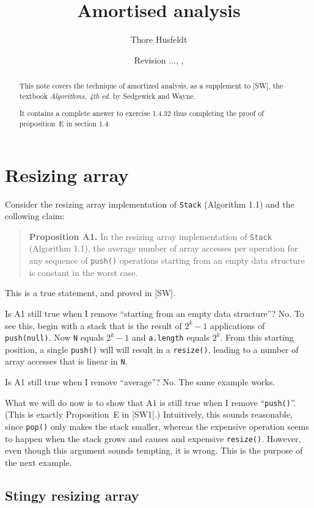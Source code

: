 \documentclass{tufte-handout}
\title{Amortised analysis}
\author{Thore Husfeldt}
\date{\small Revision {\tt \GITAbrHash}$\ldots$, \GITAuthorDate, \GITAuthorName}
\begin{document}
\maketitle
\begin{abstract}
  This note covers the technique of amortized analysis, as a
  supplement to [SW], the textbook \emph{Algorithms, 4th ed.} by
  Sedgewick and Wayne.

  It contains a complete answer to exercise 1.4.32 thus completing the
  proof of proposition~E in section 1.4.
\end{abstract}

\section{Resizing array}
\label{sec-1.1}

Consider the resizing array implementation of {\tt Stack} (Algorithm
1.1) and the collowing claim:

   
\begin{quote} {\bf Proposition A1.} In the resizing array
  implementation of {\tt Stack} (Algorithm 1.1), the average number of
  array accesses per operation for any sequence of {\tt push()} operations starting
  from an empty data structure is constant in the worst case.
\end{quote}

This is a true statement, and proved in [SW].

Is A1 still true when I remove ``starting from an empty data
structure''?
No.
To see this, begin with a stack that is the result of $2^k-1$
applications of {\tt push(null)}. 
Now {\tt N} equals $2^k-1$ and {\tt  a.length} equals $2^k$. 
From this starting position, a single {\tt push()} will will result in
a {\tt resize()}, leading to a  number of array accesses that is
linear in {\tt N}.
   
Is A1 still true when I remove ``average''?
No.
The same example works.
   
What we will do now is to show that A1 is still true when I remove
``{\tt push()}''. 
(This is exactly Proposition~E in [SW1].)
Intuitively, this sounds reasonable, since {\tt pop()} only makes the
stack smaller, whereas the expensive operation seems to happen when
the stack grows and causes and expensive {\tt resize()}.
However, even though this argument sounds tempting, it is wrong.
This is the purpose of the next example.
  
\subsection*{Stingy resizing array}
\label{sec-1.2}
\end{document}
